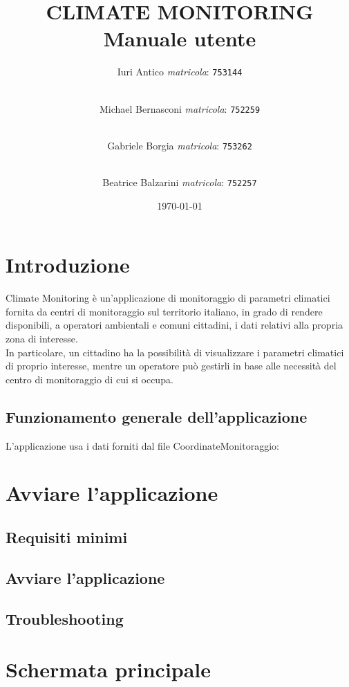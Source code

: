 \documentclass[a4paper,12pt,twoside]{article}
\title {
	CLIMATE MONITORING \\
	{Manuale utente}}
\author{
	Iuri Antico \textit{matricola}:
	\texttt{753144}
	\and \\
	Michael Bernasconi \textit{matricola}:
	\texttt{752259}
	\and \\
	Gabriele Borgia \textit{matricola}:
	\texttt{753262}
	\and \\
	Beatrice Balzarini \textit{matricola}:
	\texttt{752257}
}
\date{\today}
\begin{document}
	
	\makeatletter
	\begin{titlepage}
		\maketitle
	\end{titlepage}
	\makeatother

	\tableofcontents

	\newpage
	
	\section{Introduzione}
	Climate Monitoring è un'applicazione di monitoraggio di parametri climatici fornita da centri di monitoraggio sul territorio italiano, in grado di rendere disponibili, a operatori ambientali e comuni cittadini, i dati relativi alla propria zona di interesse. \\	
	In particolare, un cittadino ha la possibilità di visualizzare i parametri climatici di proprio interesse, mentre un operatore può gestirli in base alle necessità del centro di monitoraggio di cui si occupa.
	
		\subsection{Funzionamento generale dell'applicazione}
		L'applicazione usa i dati forniti dal file CoordinateMonitoraggio:
	
	\newpage
			
	\section{Avviare l'applicazione}
	
		\subsection{Requisiti minimi}
		
		\subsection{Avviare l'applicazione}
		
		\subsection{Troubleshooting}
		
	\newpage
		
	\section{Schermata principale}
	
\end{document}
